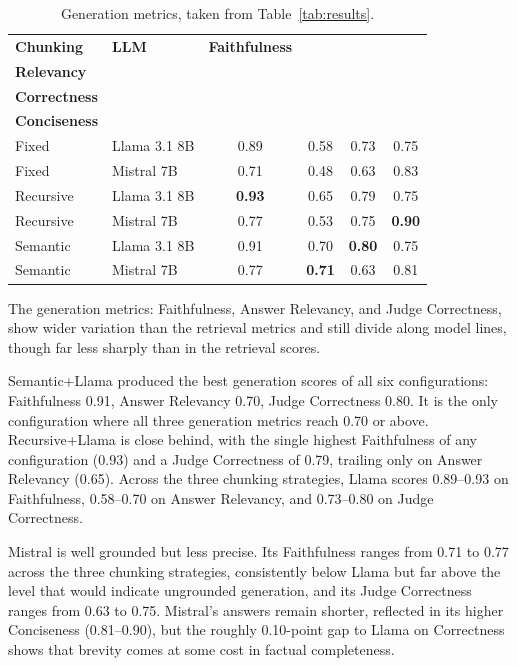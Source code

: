 \begin{table}[ht]
\centering
\begin{tabular}{llcccc}
\toprule
\textbf{Chunking} & \textbf{LLM} & \textbf{Faithfulness}
  & \makecell{\textbf{Answer}\\\textbf{Relevancy}}
  & \makecell{\textbf{Judge}\\\textbf{Correctness}}
  & \makecell{\textbf{Judge}\\\textbf{Conciseness}} \\
\midrule
Fixed     & Llama 3.1 8B & 0.89 & 0.58 & 0.73 & 0.75 \\
Fixed     & Mistral 7B   & 0.71 & 0.48 & 0.63 & 0.83 \\
Recursive & Llama 3.1 8B & \textbf{0.93} & 0.65 & 0.79 & 0.75 \\
Recursive & Mistral 7B   & 0.77 & 0.53 & 0.75 & \textbf{0.90} \\
Semantic  & Llama 3.1 8B & 0.91 & 0.70 & \textbf{0.80} & 0.75 \\
Semantic  & Mistral 7B   & 0.77 & \textbf{0.71} & 0.63 & 0.81 \\
\bottomrule
\end{tabular}
\caption{Generation metrics, taken from Table~\ref{tab:results}.}
\label{tab:excerpt-generation}
\end{table}

The generation metrics: Faithfulness, Answer Relevancy, and Judge Correctness, show wider variation than the retrieval metrics and still divide along model lines, though far less sharply than in the retrieval scores.

Semantic+Llama produced the best generation scores of all six configurations: Faithfulness 0.91, Answer Relevancy 0.70, Judge Correctness 0.80. It is the only configuration where all three generation metrics reach 0.70 or above. Recursive+Llama is close behind, with the single highest Faithfulness of any configuration (0.93) and a Judge Correctness of 0.79, trailing only on Answer Relevancy (0.65). Across the three chunking strategies, Llama scores 0.89--0.93 on Faithfulness, 0.58--0.70 on Answer Relevancy, and 0.73--0.80 on Judge Correctness.

Mistral is well grounded but less precise. Its Faithfulness ranges from 0.71 to 0.77 across the three chunking strategies, consistently below Llama but far above the level that would indicate ungrounded generation, and its Judge Correctness ranges from 0.63 to 0.75. Mistral's answers remain shorter, reflected in its higher Conciseness (0.81--0.90), but the roughly 0.10-point gap to Llama on Correctness shows that brevity comes at some cost in factual completeness.


